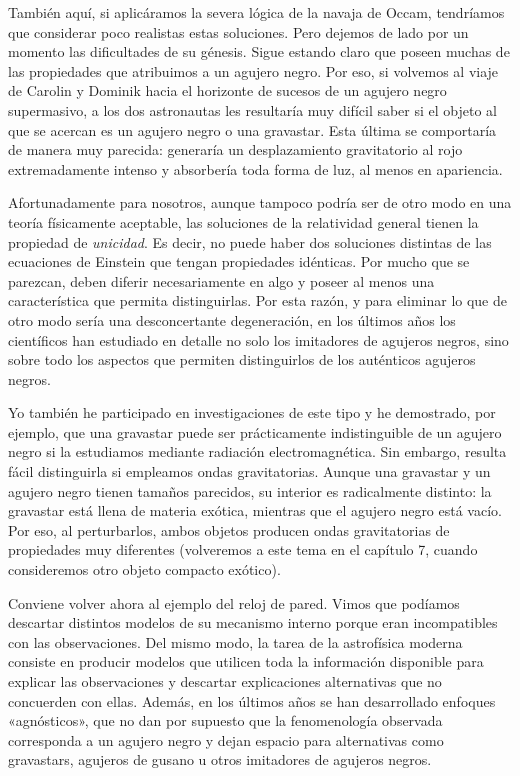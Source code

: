 También aquí, si aplicáramos la severa lógica de la navaja de Occam, tendríamos que considerar poco realistas estas soluciones. Pero dejemos de lado por un momento las dificultades de su génesis. Sigue estando claro que poseen muchas de las propiedades que atribuimos a un agujero negro. Por eso, si volvemos al viaje de Carolin y Dominik hacia el horizonte de sucesos de un agujero negro supermasivo, a los dos astronautas les resultaría muy difícil saber si el objeto al que se acercan es un agujero negro o una gravastar. Esta última se comportaría de manera muy parecida: generaría un desplazamiento gravitatorio al rojo extremadamente intenso y absorbería toda forma de luz, al menos en apariencia.

Afortunadamente para nosotros, aunque tampoco podría ser de otro modo en una teoría físicamente aceptable, las soluciones de la relatividad general tienen la propiedad de \emph{unicidad}. Es decir, no puede haber dos soluciones distintas de las ecuaciones de Einstein que tengan propiedades idénticas. Por mucho que se parezcan, deben diferir necesariamente en algo y poseer al menos una característica que permita distinguirlas. Por esta razón, y para eliminar lo que de otro modo sería una desconcertante degeneración, en los últimos años los científicos han estudiado en detalle no solo los imitadores de agujeros negros, sino sobre todo los aspectos que permiten distinguirlos de los auténticos agujeros negros.

Yo también he participado en investigaciones de este tipo y he demostrado, por ejemplo, que una gravastar puede ser prácticamente indistinguible de un agujero negro si la estudiamos mediante radiación electromagnética. Sin embargo, resulta fácil distinguirla si empleamos ondas gravitatorias. Aunque una gravastar y un agujero negro tienen tamaños parecidos, su interior es radicalmente distinto: la gravastar está llena de materia exótica, mientras que el agujero negro está vacío. Por eso, al perturbarlos, ambos objetos producen ondas gravitatorias de propiedades muy diferentes (volveremos a este tema en el capítulo 7, cuando consideremos otro objeto compacto exótico).

Conviene volver ahora al ejemplo del reloj de pared. Vimos que podíamos descartar distintos modelos de su mecanismo interno porque eran incompatibles con las observaciones. Del mismo modo, la tarea de la astrofísica moderna consiste en producir modelos que utilicen toda la información disponible para explicar las observaciones y descartar explicaciones alternativas que no concuerden con ellas. Además, en los últimos años se han desarrollado enfoques «agnósticos», que no dan por supuesto que la fenomenología observada corresponda a un agujero negro y dejan espacio para alternativas como gravastars, agujeros de gusano u otros imitadores de agujeros negros.

